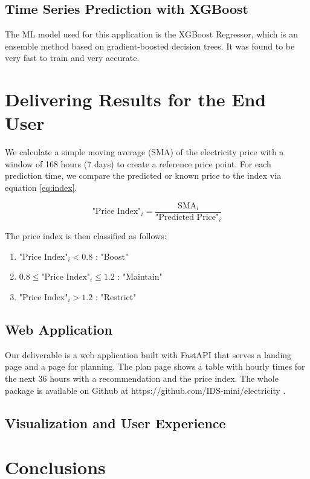 \documentclass{article}
\begin{document}
\subsection{Time Series Prediction with XGBoost}
\label{subsection:xgboost}

The ML model used for this application is the XGBoost Regressor, which is an ensemble method based on gradient-boosted decision trees. It was found to be very fast to train and very accurate.



\section{Delivering Results for the End User}
\label{section:delivery}

We calculate a simple moving average (SMA) of the electricity price with a window of 168 hours (7 days) to create a reference price point. For each prediction time, we compare the predicted or known price to the index via equation \ref{eq:index}.


\begin{equation} \label{eq:index}
\text{"Price Index"}_i = \frac{\text{SMA}_i}{\text{"Predicted Price"}_i}
\end{equation}

The price index is then classified as follows:

\begin{enumerate}
    \item $\text{"Price Index"}_i < 0.8$ : "Boost"
    \item $0.8 \leq \text{"Price Index"}_i \leq 1.2$ : "Maintain"
    \item $\text{"Price Index"}_i > 1.2$ : "Restrict"
\end{enumerate}

\subsection{Web Application}
\label{subsection:server}

Our deliverable is a web application built with FastAPI that serves a landing page and a page for planning. The plan page shows a table with hourly times for the next 36 hours with a recommendation and the price index. The whole package is available on Github at https://github.com/IDS-mini/electricity .

\subsection{Visualization and User Experience}
\label{subsection:ux}


\section{Conclusions}
\label{section:conclusions}

\end{document}
